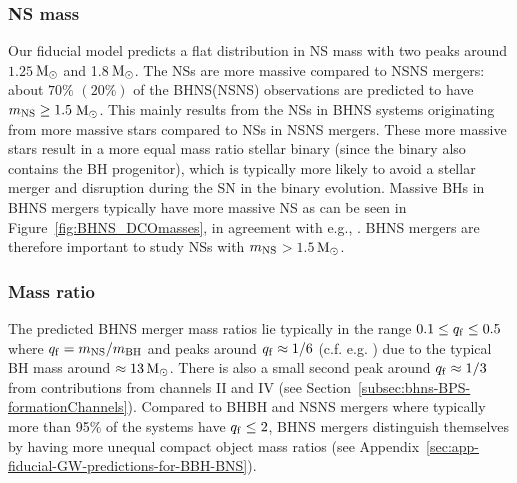 \documentclass[twocolumn]{aastex63}
\newcommand{\todo}[1]{\textcolor{red}{[To do: #1]}}
\newcommand\bhnsSingle{BHNS\xspace}
\newcommand{\Msun}{\ensuremath{\,\rm{M}_{\odot}}\xspace}
\newcommand{\mnsf}{\ensuremath{m_{\rm{NS}}}\xspace}
\newcommand{\mbhf}{\ensuremath{m_{\rm{BH}}}\xspace}
\newcommand{\qf}{\ensuremath{q_{\rm{f}}}\xspace}
\begin{document}
\subsubsection{\ac{NS} mass} 
 Our fiducial model predicts  a flat distribution in \ac{NS} mass with two peaks around $1.25$\Msun and 1.8\Msun. 
The \acp{NS} are  more massive compared to \ac{NSNS} mergers: about $ 70\% $ $(20\%)$ of the \bhnsSingle (NSNS) observations are predicted to have $\mnsf \geq 1.5$\Msun  \citep[c.f.][]{2018MNRAS.474.2959G}.
This mainly results from the \acp{NS} in  \bhnsSingle systems originating from more massive stars compared to \acp{NS} in \ac{NSNS} mergers. These more massive stars result in a more equal mass ratio stellar binary (since the binary also contains the  BH  progenitor), which is typically more likely to avoid a stellar merger and disruption during the \ac{SN}  in the binary evolution. 
Massive \acp{BH} in \bhnsSingle mergers typically have more massive \ac{NS} as can be seen in Figure~\ref{fig:BHNS_DCOmasses}, in agreement with e.g., \citet[][see Figure~7]{kruckow2018progenitors}.   
\bhnsSingle mergers are therefore important to study  \acp{NS} with \mnsf $> 1.5$\Msun. 



\subsubsection{Mass ratio} 
  The predicted \bhnsSingle merger mass ratios lie typically in the range $0.1 \leq \qf \leq 0.5$ where $\qf =\mnsf / \mbhf$ and peaks around  $\qf \approx 1/6$  (c.f. e.g. \citealt{2018MNRAS.474.2959G}) due to the typical \ac{BH} mass  around $\approx 13\Msun$. 
There is also a small second peak around $\qf \approx 1/3$ from contributions from channels II and IV (see Section~\ref{subsec:bhns-BPS-formationChannels}).  Compared to  \ac{BHBH} and \ac{NSNS} mergers where typically  more than 95$\%$ of the systems  have $\qf \leq 2$, \bhnsSingle mergers distinguish themselves by having more unequal compact object mass ratios (see Appendix~\ref{sec:app-fiducial-GW-predictions-for-BBH-BNS}). 
\end{document}
